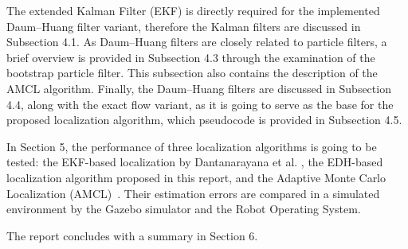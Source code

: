 The extended Kalman Filter (EKF) is directly required for the implemented Daum--Huang filter variant, therefore the Kalman filters are discussed in Subsection 4.1.
As Daum--Huang filters are closely related to particle filters, a brief overview is provided
in Subsection 4.3 through the examination of the bootstrap particle filter. This subsection also contains the description of the AMCL algorithm. Finally, the Daum--Huang filters are discussed in Subsection 4.4, along with the exact flow variant, as it is going to serve as the base for the
proposed localization algorithm, which pseudocode is provided in Subsection 4.5.


In Section 5, the performance of three localization algorithms is going to be tested:
the EKF-based localization  by Dantanarayana et al. \cite{Dantanarayana2016},
the EDH-based localization  algorithm proposed in this report,
and the Adaptive Monte Carlo Localization (AMCL)~\cite{AMCLROS2002}.
Their estimation errors are compared in a simulated environment by the Gazebo simulator and the Robot Operating System.

The report concludes with a summary in Section 6.


